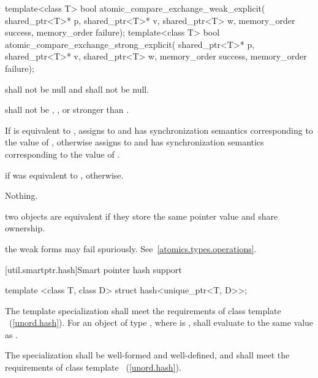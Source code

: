 %
%
\begin{itemdecl}
template<class T>
  bool atomic_compare_exchange_weak_explicit(
    shared_ptr<T>* p, shared_ptr<T>* v, shared_ptr<T> w,
    memory_order success, memory_order failure);
template<class T>
  bool atomic_compare_exchange_strong_explicit(
    shared_ptr<T>* p, shared_ptr<T>* v, shared_ptr<T> w,
    memory_order success, memory_order failure);
\end{itemdecl}

\begin{itemdescr}
\pnum
\requires {} shall not be null and  shall not be null.

\pnum
\requires {} shall not be ,
, or stronger than .

\pnum
\effects If  is equivalent to , assigns  to
 and has synchronization semantics corresponding to the value of
, otherwise assigns  to  and has
synchronization semantics corresponding to the value of .

\pnum
\returns {} if  was equivalent to ,  otherwise.

\pnum
\throws Nothing.

\pnum
\remarks two  objects are equivalent if they store the same
pointer value and share ownership.

\pnum
\remarks the weak forms may fail spuriously. See~\ref{atomics.types.operations}.
\end{itemdescr}

[util.smartptr.hash]{Smart pointer hash support}

%
\begin{itemdecl}
template <class T, class D> struct hash<unique_ptr<T, D>>;
\end{itemdecl}

\begin{itemdescr}
\pnum The template specialization shall meet the requirements of class
template ~(\ref{unord.hash}). For an object  of type ,
where  is ,  shall evaluate to
the same value as .

\pnum
\requires The specialization  shall be
well-formed and well-defined, and shall meet the requirements of class
template ~(\ref{unord.hash}).
\end{itemdescr}

